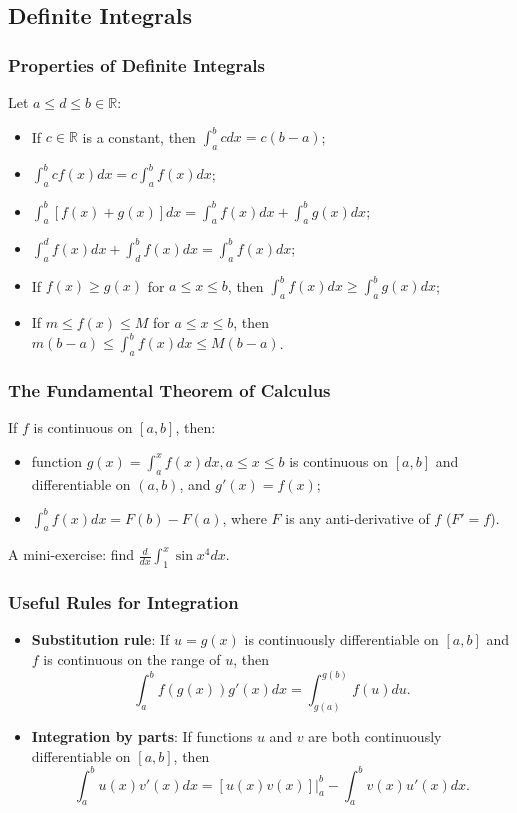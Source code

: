\documentclass{beamer}
\begin{document}
\subsection{Definite Integrals}
\begin{frame}
\frametitle{Properties of Definite Integrals}
Let $a \leq d \leq b \in \mathbb{R}$:
\begin{itemize}
\item If $c \in \mathbb{R}$ is a constant, then $\int_{a}^b c dx = c(b-a)$;
\item $\int_{a}^b cf(x) dx = c\int_{a}^b f(x) dx$;
\item $\int_{a}^b [f(x)+g(x)] dx = \int_{a}^b f(x) dx + \int_{a}^b g(x) dx$;
\item $\int_{a}^d f(x) dx + \int_{d}^b f(x) dx = \int_{a}^b f(x) dx$;
\item If $f(x) \geq g(x)$ for $a \leq x \leq b$, then $\int_{a}^b f(x) dx \geq \int_{a}^b g(x) dx$;
\item If $m \leq f(x) \leq M$ for $a \leq x \leq b$, then $m(b-a) \leq \int_{a}^b f(x) dx \leq M(b-a)$.
\end{itemize}
\end{frame}

\begin{frame}
\frametitle{The Fundamental Theorem of Calculus}
If $f$ is continuous on $[a,b]$, then:
\begin{itemize}
\item function $g(x) = \int_a^x f(x) dx, a\leq x \leq b$ is continuous on $[a,b]$ and differentiable on $(a,b)$, and $g'(x) = f(x)$;
\item $\int_a^b f(x)dx = F(b)-F(a)$, where $F$ is any anti-derivative of $f$ ($F' = f$).
\end{itemize}
\vspace*{0.15in}
A mini-exercise: 
find $\frac{d}{dx}\int_1^x \sin x^4 dx$.

\end{frame}

\begin{frame}
\frametitle{Useful Rules for Integration}
\begin{itemize}
\item \textbf{Substitution rule}: If $u=g(x)$ is continuously differentiable on $[a,b]$ and $f$ is continuous on the range of $u$, then 
$$
\int_a^b f(g(x))g'(x)dx = \int_{g(a)}^{g(b)} f(u)du.
$$ 
\item \textbf{Integration by parts}: If functions $u$ and $v$ are both continuously differentiable on $[a,b]$, then
$$
\int_{a}^{b} u(x)v'(x)dx = \left .[u(x)v(x)] \right\vert_{a}^{b} - \int_{a}^{b} v(x)u'(x)dx.
$$
\end{itemize}
\end{frame}
\end{document}
